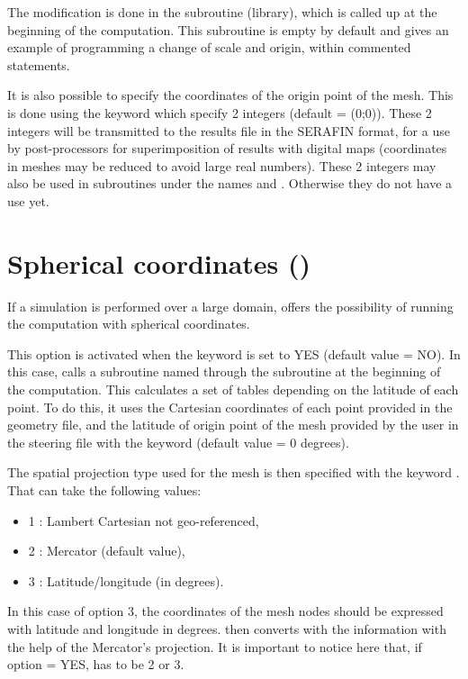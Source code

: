The modification is done in the  subroutine
(\bief library), which is called up at the beginning of the computation.
This subroutine is empty by default and gives an example of programming
a change of scale and origin, within commented statements.

It is also possible to specify the coordinates of the origin point of the mesh.
This is done using the keyword 
which specify 2 integers (default = (0;0)).
These 2 integers will be transmitted to the results file in the SERAFIN format,
for a use by post-processors for superimposition of results with digital maps
(coordinates in meshes may be reduced to avoid large real numbers).
These 2 integers may also be used in subroutines under the names
 and .
Otherwise they do not have a use yet.


\section{Spherical coordinates ()}
\label{sec:spher:coord:LATI}
If a simulation is performed over a large domain,  offers
the possibility of running the computation with spherical coordinates.

This option is activated when the keyword 
is set to YES (default value = NO).
In this case,  calls a subroutine named 
through the subroutine  at the beginning of the computation.
This calculates a set of tables depending on the latitude of each point.
To do this, it uses the Cartesian coordinates of each point provided
in the geometry file, and the latitude of origin point of the mesh
provided by the user in the steering file with the keyword
 (default value = 0 degrees).

The spatial projection type used for the mesh is then specified with the
keyword . That can take the following values:
\begin{itemize}
\item 1 : Lambert Cartesian not geo-referenced,

\item 2 : Mercator (default value),

\item 3 : Latitude/longitude (in degrees).
\end{itemize}

In this case of option 3, the coordinates of the mesh nodes should be
expressed with latitude and longitude in degrees.  then converts with
the information with the help of the Mercator's projection.
It is important to notice here that, if option 
= YES,  has to be 2 or 3.

